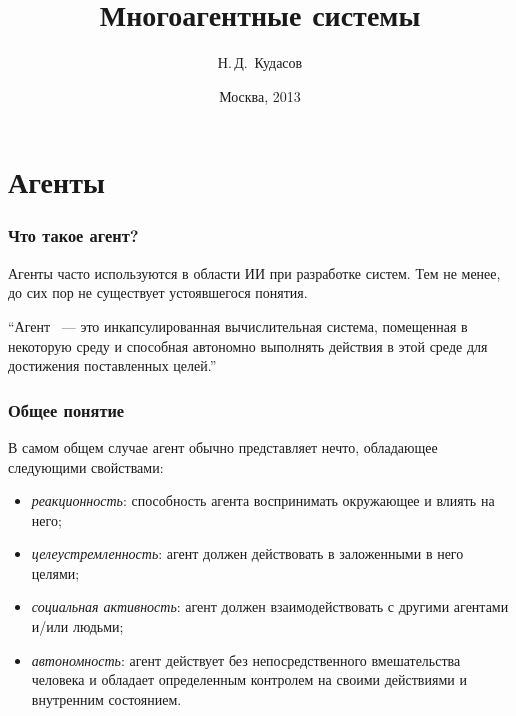 \documentclass{beamer}
\begin{document}
\title[]{Многоагентные системы}
\author{Н.\,Д.~Кудасов}

\institute{
    \vspace{2.0cm}
}
\date{Москва, 2013}

\begin{frame}
\addtocounter{framenumber}{-1}
\maketitle
\end{frame}

\section{Агенты}

\begin{frame}
  \frametitle{Что такое агент?}
  Агенты часто используются в области ИИ при разработке систем.
  Тем не менее, до сих пор не существует устоявшегося понятия.

  \begin{exampleblock}{}
    {\large ``Агент ~--- это инкапсулированная вычислительная система,
    помещенная в некоторую среду и способная автономно выполнять действия
    в этой среде для достижения поставленных целей.''}
    \vskip5mm
    \hspace*{}
  \end{exampleblock}

\end{frame}

\begin{frame}
  \frametitle{Общее понятие}
  В самом общем случае агент обычно представляет нечто, обладающее
  следующими свойствами:

  \begin{itemize}
    \item<1-> {\it реакционность}: способность агента воспринимать окружающее и влиять на него;
    \item<2-> {\it целеустремленность}: агент должен действовать в заложенными в него целями;
    \item<3-> {\it социальная активность}: агент должен взаимодействовать с другими агентами и/или людьми;
    \item<4-> {\it автономность}: агент действует без непосредственного вмешательства человека и обладает
      определенным контролем на своими действиями и внутренним состоянием.
  \end{itemize}
\end{frame}
\end{document}
